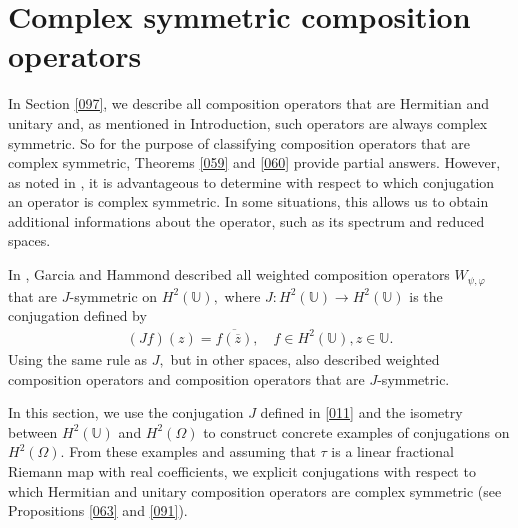 \documentclass[11pt]{amsart}%
\theoremstyle{definition}
\theoremstyle{remark}
\numberwithin{equation}{section}
\begin{document}

\section{Complex symmetric composition operators}

\label{062}

In Section \ref{097}, we describe all composition operators that are Hermitian
and unitary and, as mentioned in Introduction, such operators are always
complex symmetric. So for the purpose of classifying composition operators
that are complex symmetric, Theorems \ref{059} and \ref{060} provide partial
answers. However, as noted in \cite{Jung}, it is advantageous to determine
with respect to which conjugation an operator is complex symmetric. In some
situations, this allows us to obtain additional informations about the
operator, such as its spectrum and reduced spaces.

In \cite{Garc1}, Garcia and Hammond described all weighted composition
operators $W_{\psi, \varphi}$ that are $J$-symmetric on $H^{2}(\mathbb{U}),$
where $J:H^{2}(\mathbb{U})\longrightarrow H^{2}(\mathbb{U})$ is the
conjugation defined by
\begin{align}
\label{011}(Jf)(z)=\overline{f(\overline{z})}, \quad f\in H^{2}(\mathbb{U}),
z\in\mathbb{U}.
\end{align}
Using the same rule as $J,$ but in other spaces, \cite{Hai, Hai2, Han, Jung}
also described weighted composition operators and composition operators that
are $J$-symmetric.

In this section, we use the conjugation $J$ defined in \eqref{011} and the
isometry between $H^{2}(\mathbb{U})$ and $H^{2}(\Omega)$ to construct concrete
examples of conjugations on $H^{2}(\Omega).$ From these examples and assuming
that $\tau$ is a linear fractional Riemann map
with real coefficients, we explicit conjugations with respect to which
Hermitian and unitary composition operators are complex symmetric (see
Propositions \ref{063} and \ref{091}).
\end{document}
